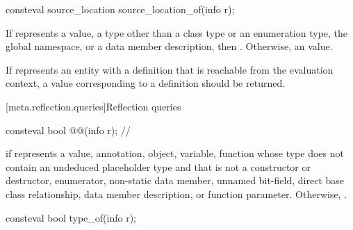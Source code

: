 %
\begin{itemdecl}
consteval source_location source_location_of(info r);
\end{itemdecl}

\begin{itemdescr}
\pnum
\returns
If  represents
a value,
a type other than a class type or an enumeration type,
the global namespace, or
a data member description,
then .
Otherwise, an
 value.

\pnum
\recommended
If  represents an entity with a definition
that is reachable from the evaluation context,
a value corresponding to a definition should be returned.
\end{itemdescr}

[meta.reflection.queries]{Reflection queries}

\begin{itemdecl}
consteval bool @@(info r);  // \expos
\end{itemdecl}

\begin{itemdescr}
\pnum
\returns
{} if  represents a
value,
annotation,
object,
variable,
function whose type does not contain an undeduced placeholder type
and that is not a constructor or destructor,
enumerator,
non-static data member,
unnamed bit-field,
direct base class relationship,
data member description, or
function parameter.
Otherwise, .
\end{itemdescr}

%
\begin{itemdecl}
consteval bool type_of(info r);
\end{itemdecl}


